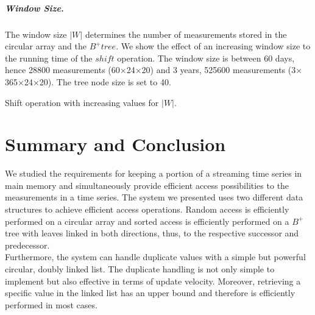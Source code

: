 \documentclass[abstracton,12pt,oneside]{scrreprt}
\begin{document}
\paragraph{Window Size.}
The window size $|W|$ determines the number of measurements stored in the circular array and the $B^+tree$. We show the effect of an increasing window size to the running time of the $shift$ operation. The window size is between 60 days, hence 28800 measurements (60$\times$24$\times$20) and 3 years, 525600 measurements (3$\times$365$\times$24$\times$20). The tree node size is set to 40. 

\begin{table}[H]
	\caption{Shift operation with increasing values for $|W|$.}
\end{table}

\chapter{Summary and Conclusion}
\label{sec:Summary}
We studied the requirements for keeping a portion of a streaming time series in main memory and simultaneously provide efficient access possibilities to the measurements in a time series. The system we presented uses two different data structures to achieve efficient access operations. Random access is efficiently performed on a circular array and sorted access is efficiently performed on a $B^+$tree with leaves linked in both directions, thus, to the respective successor and predecessor. \\Furthermore, the system can handle duplicate values with a simple but powerful circular, doubly linked list. The duplicate handling is not only simple to implement but also effective in terms of update velocity. Moreover, retrieving a specific value in the linked list has an upper bound and therefore is efficiently performed in most cases. 
\end{document}
